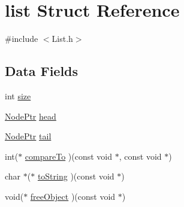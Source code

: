 \hypertarget{structlist}{\section{list Struct Reference}
\label{structlist}
}


{\ttfamily \#include $<$List.\-h$>$}

\subsection*{Data Fields}
\begin{DoxyCompactItemize}
\item 
int \hyperlink{structlist_a3b03adad0c0429bae9493667ff366dc2}{size}
\item 
\hyperlink{Node_8h_aa6eec21621b8638e350fd0ec238a9715}{Node\-Ptr} \hyperlink{structlist_a357a56cbe66297fb5cc5cd8ba9fa6cf4}{head}
\item 
\hyperlink{Node_8h_aa6eec21621b8638e350fd0ec238a9715}{Node\-Ptr} \hyperlink{structlist_a7fba27040dab68e2d6acc2885b6df167}{tail}
\item 
int($\ast$ \hyperlink{structlist_ad3ad01e7ea22f2e0590e1d5549c8ab7f}{compare\-To} )(const void $\ast$, const void $\ast$)
\item 
char $\ast$($\ast$ \hyperlink{structlist_a3447393f975f748b5df5247155e9298a}{to\-String} )(const void $\ast$)
\item 
void($\ast$ \hyperlink{structlist_a04091cb910e425d1226562197fe0bf8c}{free\-Object} )(const void $\ast$)
\end{DoxyCompactItemize}


